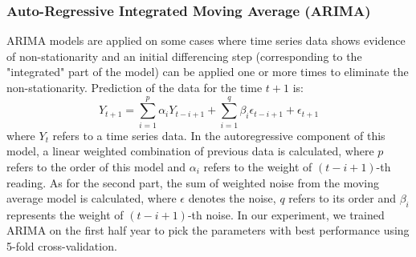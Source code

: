 	\subsubsection{Auto-Regressive Integrated Moving Average (ARIMA)}
	ARIMA models are applied on some cases where time series data shows evidence of non-stationarity and an initial differencing step (corresponding to the "integrated" part of the model) can be applied one or more times to eliminate the non-stationarity.
	Prediction of the data for the time $t+1$  is:
	$$ Y_{t+1} = \sum_{i=1}^p \alpha_i Y_{t-i+1}  + \sum_{i=1}^q \beta_i \epsilon_{t-i+1} + \epsilon_{t+1}$$
	where $Y_t$ refers to a time series data. 
	In the autoregressive component of this model, a linear weighted combination of previous data is calculated, where $p$ refers to the order of this model and $\alpha_i$ refers to the weight of $(t-i+1)$-th reading. 
	As for the second part, the sum of weighted noise from the moving average model is calculated, where $\epsilon$ denotes the noise, $q$ refers to its order and $\beta_i$ represents the weight of $(t-i+1)$-th noise.
	In our experiment, we trained ARIMA on the first half year to pick the parameters with best performance using 5-fold cross-validation.
	
	
	
